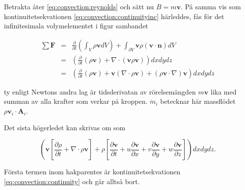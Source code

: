 Betrakta åter \eqref{eq:convection:reynolds} och sätt nu $B = m\mathbf{v}$. På samma vis som kontinuitetsekvationen \eqref{eq:convection:continuityinc} härleddes, fås för det infinitesimala volymelementet i figur sambandet

\begin{eqnarray}
\label{eq:convection:linear}
\sum \mathbf{F} & = & \frac{\partial}{\partial t} \left( \int_V \rho\mathbf{v} dV \right) + \int_{\partial V} \mathbf{v}\rho\left( \mathbf{v} \cdot \mathbf{n}\right)dV \nonumber \\
& = &\left(\frac{\partial}{\partial t} \left( \rho\mathbf{v} \right) + \nabla \cdot \left( \mathbf{v} \rho \mathbf{v}\right)\right)dxdydz \nonumber\\
& = &\left( \frac{\partial}{\partial t} \left( \rho\mathbf{v} \right) + \mathbf{v}\left(\nabla\cdot\rho\mathbf{v}\right) + \left(\rho\mathbf{v} \cdot \nabla\right) \mathbf{v}\right) dxdydz
\end{eqnarray}

ty enligt Newtons andra lag är tidsderivatan av rörelsemängden $m\mathbf{v}$ lika med summan av alla krafter som verkar på kroppen. $\dot{m}_i$ betecknar här massflödet $\rho\mathbf{v}_i\cdot\mathbf{A}_i$.

Det sista högerledet kan skrivas om som

\begin{equation}
\left( \mathbf{v}\left[ \frac{\partial \rho}{\partial t} + \nabla\cdot \rho \mathbf{v}\right] + \rho\left[ \frac{\partial \mathbf{v}}{\partial t} + u\frac{\partial\mathbf{v}}{\partial x} + v\frac{\partial\mathbf{v}}{\partial y} + w\frac{\partial\mathbf{v}}{\partial z} \right]\right)dxdydz.
\end{equation}

Första termen inom hakparentes är kontinuitetsekvationen \eqref{eq:convection:continuity} och går alltså bort.

